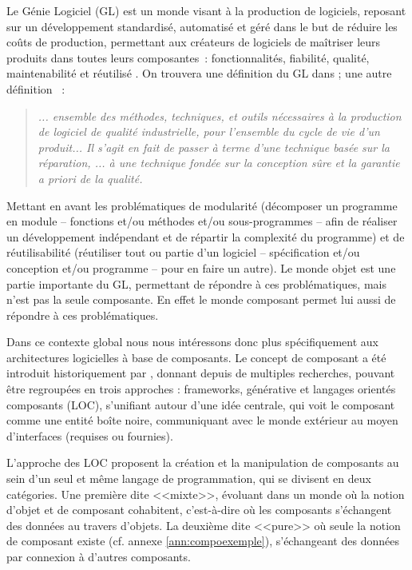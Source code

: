   
  Le Génie Logiciel (GL) est un monde visant à la production de logiciels, reposant sur un développement standardisé, automatisé et géré dans le but de réduire les coûts de production, permettant aux créateurs de logiciels de maîtriser leurs produits dans toutes leurs composantes~: fonctionnalités, fiabilité, qualité, maintenabilité et réutilisé \cite{dony1989langages}. On trouvera une définition du GL dans \cite{Boehm:1976:SE:1311958.1312684}; une autre définition \cite{krakowiak:1986}~: 
 
   \begin{quote}
      \emph{ ... ensemble des méthodes, techniques, et outils nécessaires à la
production de logiciel de qualité industrielle, pour l'ensemble du cycle
de vie d'un produit... Il s'agit en fait de passer à terme d'une technique
basée sur la réparation, ... à une technique fondée sur la conception sûre
et la garantie a priori de la qualité.} 
  \end{quote}

  Mettant en avant les problématiques de modularité (décomposer un programme en module -- fonctions et/ou méthodes et/ou sous-programmes -- afin de réaliser un développement indépendant et de répartir la complexité du programme) et de réutilisa\-bilité (réutiliser tout ou partie d'un logiciel -- spécification et/ou conception et/ou programme -- pour en faire un autre). Le monde objet est une partie importante du GL, permettant de répondre à ces problématiques, mais n'est pas la seule composante.  En effet le monde composant permet lui aussi de répondre à ces problématiques.\\\par
  
  Dans ce contexte global nous nous intéressons donc plus spécifiquement aux architectures logicielles à base de composants.
  Le concept de composant a été introduit historiquement par \cite{Il68}, donnant depuis de multiples recherches, pouvant être regroupées en trois approches : frameworks, générative et langages orientés composants (LOC), s'unifiant autour d'une idée centrale, qui voit le composant comme une entité boîte noire, communiquant avec le monde extérieur au moyen d'interfaces (requises ou fournies). \\\par
  
  L'approche des LOC proposent la création et la manipulation de composants au sein d'un seul et même langage de programmation, qui se divisent en deux catégories. Une première dite <<mixte>>, évoluant dans un monde où la notion d'objet et de composant cohabitent, c'est-à-dire où les composants s'échangent des données au travers d'objets. La deuxième dite <<pure>> où seule la notion de composant existe (cf. annexe \ref{ann:compoexemple}), s'échangeant des données par connexion à d'autres composants. \\\par
  
